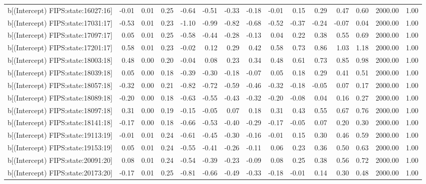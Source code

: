 \begin{table}[ht]
\begin{tabular}{rrrrrrrrrrrrrrr}
  b[(Intercept) FIPS:state:16027:16] & -0.01 & 0.01 & 0.25 & -0.64 & -0.51 & -0.33 & -0.18 & -0.01 & 0.15 & 0.29 & 0.47 & 0.60 & 2000.00 & 1.00 \\ 
  b[(Intercept) FIPS:state:17031:17] & -0.53 & 0.01 & 0.23 & -1.10 & -0.99 & -0.82 & -0.68 & -0.52 & -0.37 & -0.24 & -0.07 & 0.04 & 2000.00 & 1.00 \\ 
  b[(Intercept) FIPS:state:17097:17] & 0.05 & 0.01 & 0.25 & -0.58 & -0.44 & -0.28 & -0.13 & 0.04 & 0.22 & 0.38 & 0.55 & 0.69 & 2000.00 & 1.00 \\ 
  b[(Intercept) FIPS:state:17201:17] & 0.58 & 0.01 & 0.23 & -0.02 & 0.12 & 0.29 & 0.42 & 0.58 & 0.73 & 0.86 & 1.03 & 1.18 & 2000.00 & 1.00 \\ 
  b[(Intercept) FIPS:state:18003:18] & 0.48 & 0.00 & 0.20 & -0.04 & 0.08 & 0.23 & 0.34 & 0.48 & 0.61 & 0.73 & 0.85 & 0.98 & 2000.00 & 1.00 \\ 
  b[(Intercept) FIPS:state:18039:18] & 0.05 & 0.00 & 0.18 & -0.39 & -0.30 & -0.18 & -0.07 & 0.05 & 0.18 & 0.29 & 0.41 & 0.51 & 2000.00 & 1.00 \\ 
  b[(Intercept) FIPS:state:18057:18] & -0.32 & 0.00 & 0.21 & -0.82 & -0.72 & -0.59 & -0.46 & -0.32 & -0.18 & -0.05 & 0.07 & 0.17 & 2000.00 & 1.00 \\ 
  b[(Intercept) FIPS:state:18089:18] & -0.20 & 0.00 & 0.18 & -0.63 & -0.55 & -0.43 & -0.32 & -0.20 & -0.08 & 0.04 & 0.16 & 0.27 & 2000.00 & 1.00 \\ 
  b[(Intercept) FIPS:state:18097:18] & 0.31 & 0.00 & 0.19 & -0.15 & -0.05 & 0.07 & 0.18 & 0.31 & 0.43 & 0.55 & 0.67 & 0.76 & 2000.00 & 1.00 \\ 
  b[(Intercept) FIPS:state:18141:18] & -0.17 & 0.00 & 0.18 & -0.66 & -0.53 & -0.40 & -0.29 & -0.17 & -0.05 & 0.07 & 0.20 & 0.30 & 2000.00 & 1.00 \\ 
  b[(Intercept) FIPS:state:19113:19] & -0.01 & 0.01 & 0.24 & -0.61 & -0.45 & -0.30 & -0.16 & -0.01 & 0.15 & 0.30 & 0.46 & 0.59 & 2000.00 & 1.00 \\ 
  b[(Intercept) FIPS:state:19153:19] & 0.05 & 0.01 & 0.24 & -0.55 & -0.41 & -0.26 & -0.11 & 0.06 & 0.23 & 0.36 & 0.50 & 0.63 & 2000.00 & 1.00 \\ 
  b[(Intercept) FIPS:state:20091:20] & 0.08 & 0.01 & 0.24 & -0.54 & -0.39 & -0.23 & -0.09 & 0.08 & 0.25 & 0.38 & 0.56 & 0.72 & 2000.00 & 1.00 \\ 
  b[(Intercept) FIPS:state:20173:20] & -0.17 & 0.01 & 0.25 & -0.81 & -0.66 & -0.49 & -0.33 & -0.18 & -0.01 & 0.14 & 0.30 & 0.48 & 2000.00 & 1.00 \\ 

\end{tabular}
\end{table}

